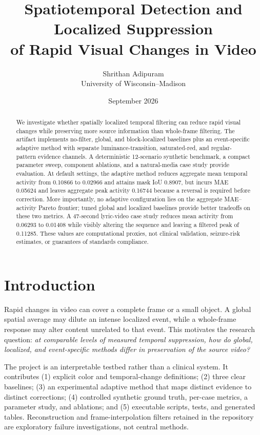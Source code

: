 \documentclass[9pt,twocolumn]{article}
\title{Spatiotemporal Detection and Localized Suppression\\of Rapid Visual Changes in Video}
\author{Shrithan Adipuram\\University of Wisconsin--Madison}
\date{September 2026}
\begin{document}
\maketitle

\begin{abstract}
We investigate whether spatially localized temporal filtering can reduce rapid visual changes while preserving more source information than whole-frame filtering. The artifact implements no-filter, global, and block-localized baselines plus an event-specific adaptive method with separate luminance-transition, saturated-red, and regular-pattern evidence channels. A deterministic 12-scenario synthetic benchmark, a compact parameter sweep, component ablations, and a natural-media case study provide evaluation. At default settings, the adaptive method reduces aggregate mean temporal activity from 0.10866 to 0.02966 and attains mask IoU 0.8907, but incurs MAE 0.05624 and leaves aggregate peak activity 0.16744 because a reversal is required before correction. More importantly, no adaptive configuration lies on the aggregate MAE--activity Pareto frontier; tuned global and localized baselines provide better tradeoffs on these two metrics. A 47-second lyric-video case study reduces mean activity from 0.06293 to 0.01408 while visibly altering the sequence and leaving a filtered peak of 0.11285. These values are computational proxies, not clinical validation, seizure-risk estimates, or guarantees of standards compliance.
\end{abstract}

\section{Introduction}
Rapid changes in video can cover a complete frame or a small object. A global spatial average may dilute an intense localized event, while a whole-frame response may alter content unrelated to that event. This motivates the research question: \emph{at comparable levels of measured temporal suppression, how do global, localized, and event-specific methods differ in preservation of the source video?}

The project is an interpretable testbed rather than a clinical system. It contributes (1) explicit color and temporal-change definitions; (2) three clear baselines; (3) an experimental adaptive method that maps distinct evidence to distinct corrections; (4) controlled synthetic ground truth, per-case metrics, a parameter study, and ablations; and (5) executable scripts, tests, and generated tables. Reconstruction and frame-interpolation filters retained in the repository are exploratory failure investigations, not central methods.
\end{document}
